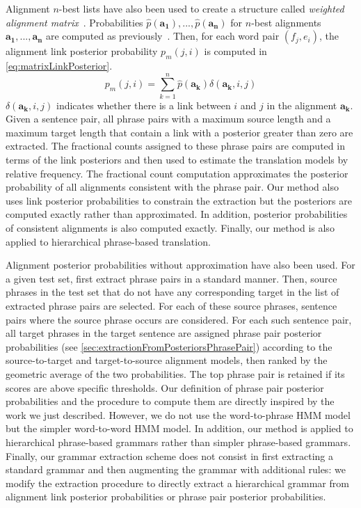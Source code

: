 Alignment $n$-best lists have also been used to create a
structure called
\emph{weighted alignment matrix}~\citep{liu-xia-xiao-liu:2009:EMNLP}.
Probabilities $\hat{p}(\bm{a_1}), ..., \hat{p}(\bm{a_n})$
for $n$-best alignments $\bm{a_1}, ..., \bm{a_n}$ are computed
as previously~\citep{venugopal-zollmann-smith-vogel:2008:AMTA}.
Then, for each word pair $(f_j, e_i)$, the alignment link posterior
probability $p_m(j, i)$ is computed in \autoref{eq:matrixLinkPosterior}.
%
\begin{equation}
  p_m(j, i) = \sum_{k = 1}^n \hat{p}(\bm{a_k}) \delta(\bm{a_k}, i, j)
  \label{eq:matrixLinkPosterior}
\end{equation}
%
$\delta(\bm{a_k}, i, j)$ indicates whether there is a link between $i$ and
$j$ in the alignment $\bm{a_k}$. Given a sentence pair, all phrase
pairs with a maximum source length and a maximum target length that
contain a link with a posterior greater than zero are extracted. The
fractional counts assigned to these phrase pairs are computed in terms
of the link posteriors and then used to estimate the translation models
by relative frequency. The fractional count computation approximates
the posterior probability of all alignments consistent with the phrase
pair. Our method also uses link posterior probabilities
to constrain the extraction but the posteriors are computed
exactly rather than approximated. In addition, posterior probabilities
of consistent alignments is also computed exactly. Finally, our method
is also applied to hierarchical phrase-based translation.

Alignment posterior probabilities without approximation have also been
used.
For a given test set, \citet{deng-and-byrne:2008:ASLP} first extract
phrase pairs in a standard manner. Then, source phrases in the test set
that do not have any corresponding target in the list of extracted
phrase pairs are selected. For each of these source phrases, sentence
pairs where the source phrase occurs are considered. For each such
sentence pair, all target phrases in the target sentence are assigned
phrase pair posterior
probabilities (see \autoref{sec:extractionFromPosteriorsPhrasePair})
according to the
source-to-target and target-to-source alignment models, then ranked
by the geometric average of the two probabilities. The top phrase pair
is retained if its scores are above specific thresholds.
Our definition of phrase pair posterior probabilities and the procedure to compute
them are directly inspired by the work we just described. However, we do not use
the word-to-phrase HMM model but the simpler word-to-word HMM model.
In addition, our method is applied to hierarchical phrase-based grammars
rather than simpler phrase-based grammars. Finally, our grammar
extraction scheme does not consist in
first extracting a standard grammar and then augmenting the grammar with additional rules: we
modify the extraction procedure to directly extract a hierarchical
grammar from alignment link posterior probabilities
or phrase pair posterior probabilities.

